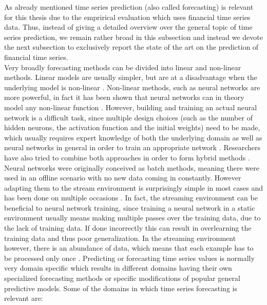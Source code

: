As already mentioned time series prediction (also called forecasting) is relevant for this thesis due to the emprirical evaluation which uses financial time series data. Thus, instead of giving a detailed overview over the general topic of time series prediction, we remain rather broad in this subsection and instead we devote the next subsection to exclusively report the state of the art on the prediction of financial time series. \\
Very broadly forecasting methods can be divided into linear and non-linear methods. Linear models are usually simpler, but are at a disadvantage when the underlying model is non-linear \cite{zhang2003time}. Non-linear methods, such as neural networks are more powerful, in fact it has been shown that neural networks can in theory model any non-linear function \cite{abraham2005artificial} \cite{funahashi1989approximate}. However, building and training an actual neural network is a difficult task, since multiple design choices (such as the number of hidden neurons, the activation function and the initial weights) need to be made, which usually requires expert knowledge of both the underlying domain as well as neural networks in general in order to train an appropriate network \cite{abraham2005artificial}. Researchers have also tried to combine both approaches in order to form hybrid methods \cite{zhang2003time}. \newline
Neural networks were originally conceived as batch methods, meaning there were used in an offline scenario with no new data coming in constantly. However adapting them to the stream environment is surprisingly simple in most cases and has been done on multiple occasions \cite{chang2002real} \cite{frank2001time}. In fact, the streaming environment can be beneficial to neural network training, since training a neural network in a static environment usually means making multiple passes over the training data, due to the lack of training data. If done incorrectly this can result in overlearning the training data and thus poor generalization. In the streaming environment however, there is an abundance of data, which means that each example has to be processed only once \cite{gama2010knowledge}. \newline
Predicting or forecasting time series values is normally very domain specific which results in different domains having their own specialized forecasting methods or specific modifications of popular general predictive models. Some of the domains in which time series forecasting is relevant are:

